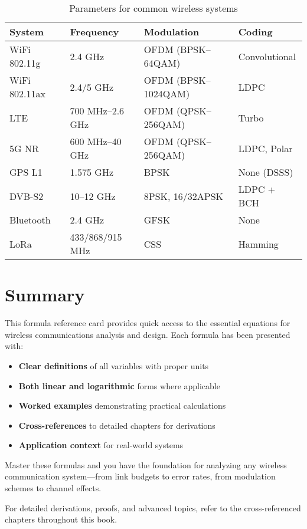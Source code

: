 \begin{table}[h]
\centering
\small
\begin{tabular}{@{}llll@{}}
\toprule
\textbf{System} & \textbf{Frequency} & \textbf{Modulation} & \textbf{Coding} \\
\midrule
WiFi 802.11g & 2.4 GHz & OFDM (BPSK--64QAM) & Convolutional \\
WiFi 802.11ax & 2.4/5 GHz & OFDM (BPSK--1024QAM) & LDPC \\
LTE & 700 MHz--2.6 GHz & OFDM (QPSK--256QAM) & Turbo \\
5G NR & 600 MHz--40 GHz & OFDM (QPSK--256QAM) & LDPC, Polar \\
GPS L1 & 1.575 GHz & BPSK & None (DSSS) \\
DVB-S2 & 10--12 GHz & 8PSK, 16/32APSK & LDPC + BCH \\
Bluetooth & 2.4 GHz & GFSK & None \\
LoRa & 433/868/915 MHz & CSS & Hamming \\
\bottomrule
\end{tabular}
\caption{Parameters for common wireless systems}
\label{tab:systems}
\end{table}

\section{Summary}

This formula reference card provides quick access to the essential equations for wireless communications analysis and design. Each formula has been presented with:

\begin{itemize}
\item \textbf{Clear definitions} of all variables with proper units
\item \textbf{Both linear and logarithmic} forms where applicable
\item \textbf{Worked examples} demonstrating practical calculations
\item \textbf{Cross-references} to detailed chapters for derivations
\item \textbf{Application context} for real-world systems
\end{itemize}

\begin{keyconcept}
Master these formulas and you have the foundation for analyzing any wireless communication system---from link budgets to error rates, from modulation schemes to channel effects.
\end{keyconcept}

For detailed derivations, proofs, and advanced topics, refer to the cross-referenced chapters throughout this book.
